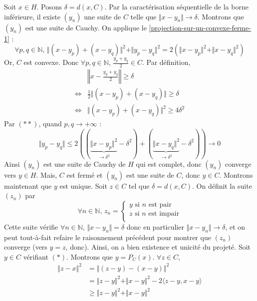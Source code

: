 	\begin{demonstration}
		Soit $x \in H$. Posons $\delta = d(x, C)$. Par la caractérisation séquentielle de la borne inférieure, il existe $(y_n)$ une suite de $C$ telle que $\Vert x - y_n \Vert \longrightarrow \delta$. Montrons que $(y_n)$ est une suite de Cauchy. On applique le \cref{projection-sur-un-convexe-ferme-1} :
		\[ \forall p, q \in \mathbb{N}, \, \Vert (x - y_p) + (x - y_q) \Vert^2 + \Vert y_p - y_q \Vert^2 = 2(\Vert x - y_p \Vert^2 + \Vert x - y_q \Vert^2) \tag{$**$} \]
		Or, $C$ est convexe. Donc $\forall p, q \in \mathbb{N}$, $\frac{y_p + y_q}{2} \in C$.
		Par définition,
		\begin{align*}
			& \left\Vert x - \frac{y_p + y_q}{2} \right\Vert \geq \delta \\
			\iff& \frac{1}{2} \Vert (x - y_p) + (x - y_q) \Vert \geq \delta \\
			\iff& \Vert (x - y_p) + (x - y_q) \Vert^2 \geq 4 \delta^2
		\end{align*}
		Par $(**)$, quand $p, q \longrightarrow +\infty$ :
		\[ \Vert y_p - y_q \Vert \leq 2((\underbrace{\Vert x - y_p \Vert^2}_{\longrightarrow \delta^2} - \delta^2) + (\underbrace{\Vert x - y_q \Vert^2}_{\longrightarrow \delta^2} - \delta^2)) \longrightarrow 0 \]
		Ainsi $(y_n)$ est une suite de Cauchy de $H$ qui est complet, donc $(y_n)$ converge vers $y \in H$. Mais, $C$ est fermé et $(y_n)$ est une suite de $C$, donc $y \in C$.
		\newpar
		Montrons maintenant que $y$ est unique. Soit $z \in C$ tel que $\delta = d(x, C)$. On définit la suite $(z_n)$ par
		\[ \forall n \in \mathbb{N}, \, z_n =
		\begin{cases}
			y \text{ si } n \text{ est pair} \\
			z \text{ si } n \text{ est impair} \\
		\end{cases}
		\]
		Cette suite vérifie $\forall n \in \mathbb{N}$, $\Vert x - y_n \Vert = \delta$ donc en particulier $\Vert x - y_n \Vert \longrightarrow \delta$, et on peut tout-à-fait refaire le raisonnement précédent pour montrer que $(z_n)$ converge (vers $y = z$, donc). Ainsi, on a bien existence et unicité du projeté.
		\newpar
		Soit $y \in C$ vérifiant $(*)$. Montrons que $y = P_C(x)$. $\forall z \in C$,
		\begin{align*}
			\Vert z - x \Vert^2 &= \Vert (z - y) - (x - y) \Vert^2 \\
			&= \Vert z - y \Vert^2 + \Vert x - y \Vert^2 - 2 \langle z - y, x - y \rangle \\
			&\geq \Vert z - y \Vert^2 + \Vert x - y \Vert^2 \\

\end{align*}
\end{demonstration}
